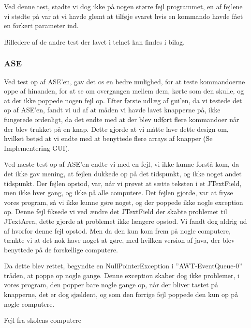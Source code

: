\documentclass[a4paper]{article}
\begin{document}
Ved denne test, stødte vi dog ikke på nogen større fejl programmet, en af fejlene vi stødte på var at vi havde glemt at tilføje svaret hvis en kommando havde fået en forkert parameter ind.

Billedere af de andre test der lavet i telnet kan findes i bilag.


\subsubsection{ASE} %

Ved test op af ASE’en, gav det os en bedre mulighed, for at teste kommandoerne oppe af hinanden, for at se om overgangen mellem dem, kørte som den skulle, og at der ikke poppede nogen fejl op. Efter første udlæg af gui’en, da vi testede det op af ASE’en, fandt vi ud af at måden vi havde lavet knapperne på, ikke fungerede ordenligt, da det endte med at der blev udført flere kommandoer når der blev trukket på en knap. Dette gjorde at vi måtte lave dette design om, hvilket betød at vi endte med at benyttede flere arrays af knapper (Se Implementering GUI).

Ved næste test op af ASE’en endte vi med en fejl, vi ikke kunne forstå kom, da det ikke gav mening, at fejlen dukkede op på det tidspunkt, og ikke noget andet tidspunkt. Der fejlen opstod, var, når vi prøvet at sætte teksten i et JTextField, men ikke hver gang, og ikke på alle computere. Det fejlen gjorde, var at fryse vores program, så vi ikke kunne gøre noget, og der poppede ikke nogle exception op. Denne fejl fiksede vi ved ændre det JTextField der skabte problemet til JTextArea, dette gjorde at problemet ikke længere opstod. Vi fandt dog aldrig ud af hvorfor denne fejl opstod. Men da den kun kom frem på nogle computere, tænkte vi at det nok have noget at gøre, med hvilken version af java, der blev benyttede på de forskellige computere.

Da dette blev rettet, begyndte en NullPointerException i ”AWT-EventQueue-0” tråden, at poppe op nogle gange. Denne exception skaber dog ikke problemer, i vores program, den popper bare nogle gange op, når der bliver tastet på knapperne, det er dog sjældent, og som den forrige fejl poppede den kun op på nogle computere.

\begin{center}
  Fejl fra skolens computere 
\end{center}

\end{document}
